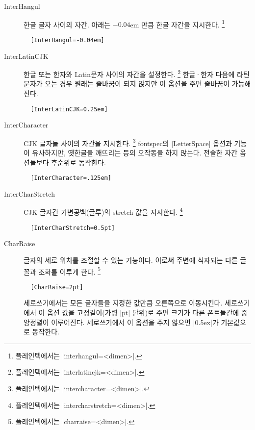 \documentclass[a4paper]{article}
\begin{document}
\begin{description}
  \item[InterHangul] %
    {한글 글자
    사이의 자간}.  아래는 $-0.04$em 만큼 한글 자간을 지시한다.%
    \footnote{%
      플레인텍에서는 |interhangul=<dimen>|. }
\begin{verbatim}
  [InterHangul=-0.04em]
\end{verbatim}

\item[InterLatinCJK] %
  한글 또는 한자와 Latin문자 사이의 자간을 설정한다.%
    \footnote{%
      플레인텍에서는 |interlatincjk=<dimen>|. }
    한글^^b7한자 다음에 라틴 문자가 오는 경우 원래는 줄바꿈이 되지 않지만
    이 옵션을 주면 줄바꿈이 가능해진다.
\begin{verbatim}
  [InterLatinCJK=0.25em]
\end{verbatim}

\item[InterCharacter] %
  CJK 글자들 사이의 자간을 지시한다.%
  \footnote{%
    플레인텍에서는 |intercharacter=<dimen>|. }
  fontspec의 |LetterSpace| 옵션과 기능이 유사하지만, 옛한글을 깨뜨리는 등의
  오작동을 하지 않는다. 전술한 자간 옵션들보다 후순위로 동작한다.
\begin{verbatim}
  [InterCharacter=.125em]
\end{verbatim}

\item[InterCharStretch] %
  CJK 글자간 가변공백{\small(글루)}의 stretch 값을 지시한다.%
  \footnote{%
    플레인텍에서는 |intercharstretch=<dimen>|. }
\begin{verbatim}
  [InterCharStretch=0.5pt]
\end{verbatim}

\item[CharRaise] %
  글자의 세로 위치를
  { 조절}할 수 있는 기능이다.
  이로써 주변에 식자되는 다른 글꼴과 조화를 이루게 한다.%
  \footnote{%
    플레인텍에서는 |charraise=<dimen>|. }
\begin{verbatim}
  [CharRaise=2pt]
\end{verbatim}
  세로쓰기에서는 모든 글자들을 지정한 값만큼 오른쪽으로 이동시킨다.
  세로쓰기에서 이 옵션 값을 고정길이{\small(가령 |pt| 단위)}로 주면
  크기가 다른 폰트들간에 중앙정렬이 이루어진다.
  세로쓰기에서 이 옵션을 주지 않으면 |0.5ex|가 기본값으로 동작한다.


\end{description}
\end{document}
